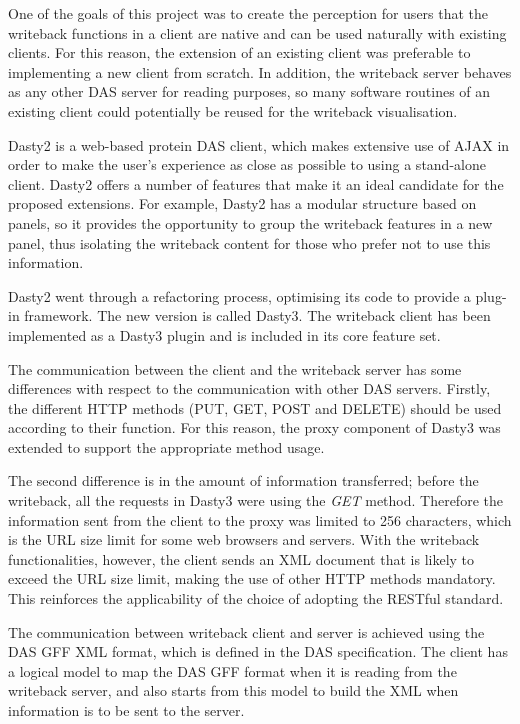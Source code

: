 One of the goals of this project was to create the perception for users that the writeback functions in a client are native and can be used naturally with existing clients. For this reason, the extension of an existing client was preferable to implementing a new client from scratch. In addition, the writeback server behaves as any other DAS server for reading purposes, so many software routines of an existing client could potentially be reused for the writeback visualisation.

Dasty2 \cite{JIM2008} is a web-based protein DAS client, which makes extensive use of AJAX in order to make the user's experience as close as possible to using a stand-alone client. Dasty2 offers a number of features that make it an ideal candidate for the proposed extensions. For example, Dasty2 has a modular structure based on panels, so it provides the opportunity to group the writeback features in a new panel, thus isolating the writeback content for those who prefer not to use this information. 

Dasty2 went through a refactoring process, optimising its code to provide a plug-in framework. The new version is called Dasty3. The writeback client has been implemented as a Dasty3 plugin and is included in its core feature set.

The communication between the client and the writeback server has some differences with respect to the communication with other DAS servers. Firstly, the different HTTP methods (PUT, GET, POST and DELETE) should be used according to their function. For this reason, the proxy component of Dasty3 was extended to support the appropriate method usage. 

The second difference is in the amount of information transferred; before the writeback, all the requests in Dasty3 were using the \emph{GET} method. Therefore the information sent from the client to the proxy was limited to 256 characters, which is the URL size limit for some web browsers and servers. With the writeback functionalities, however, the client sends an XML document that is likely to exceed the URL size limit, making the use of other HTTP methods mandatory. This reinforces the applicability of the choice of adopting the RESTful standard. 

The communication between writeback client and server is achieved using the DAS GFF XML format, which is defined in the DAS specification. The client has a logical model to map the DAS GFF format when it is reading from the writeback server, and also starts from this model to build the XML when information is to be sent to the server.

